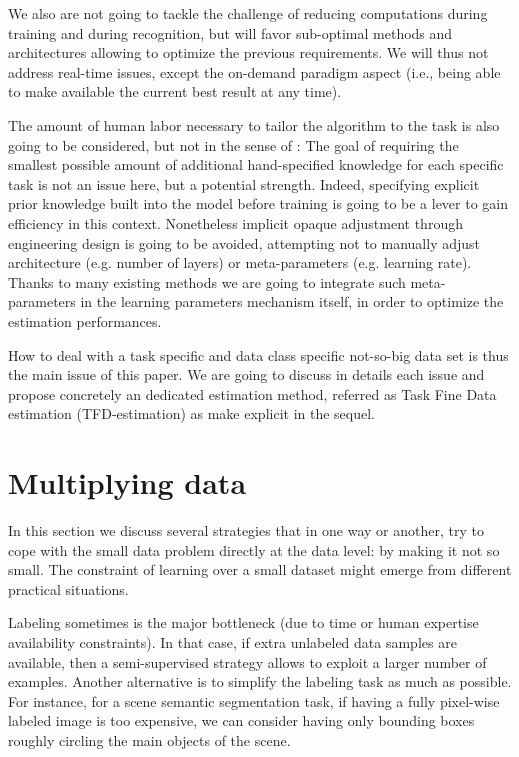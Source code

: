 \documentclass[twocolumn]{article}
\begin{document}
We also are not going to tackle the challenge of reducing computations during training and during recognition, but will favor sub-optimal methods and architectures allowing to optimize the previous requirements. We will thus not address real-time issues, except the on-demand paradigm aspect (i.e., being able to make available the current best result at any time).

The amount of human labor necessary to tailor the algorithm to the task is also going to be considered, but not in the sense of \cite{Bengio2007Scaling}: The goal of requiring the smallest possible amount of additional hand-specified knowledge for each specific task is not an issue here, but a potential strength. Indeed, specifying explicit prior knowledge built into the model before training is going to be a lever to gain efficiency in this context. Nonetheless implicit opaque adjustment through engineering design is going to be avoided, attempting not to manually adjust architecture (e.g. number of layers) or meta-parameters (e.g. learning rate). Thanks to many existing methods we are going to integrate such meta-parameters in the learning parameters mechanism itself, in order to optimize the estimation performances.



How to deal with a task specific and data class specific not-so-big data set is thus the main issue of this paper. We are going to discuss in details each issue and propose concretely an dedicated estimation method, referred as Task Fine Data estimation (TFD-estimation) as make explicit in the sequel.



\section{Multiplying data} 
In this section we discuss several strategies that in one way or another, try to cope with the small data problem directly at the data level: by making it not so small. 
The constraint of learning over a small dataset might emerge from different practical situations. 

Labeling sometimes is the major bottleneck (due to time or human expertise availability constraints). In that case, if extra unlabeled data samples are available, then a semi-supervised strategy allows to exploit a larger number of examples. Another alternative is to simplify the labeling task as much as possible. For instance, for a scene semantic segmentation task, if having a fully pixel-wise labeled image is too expensive, we can consider having only bounding boxes roughly circling the main objects of the scene.
\end{document}
